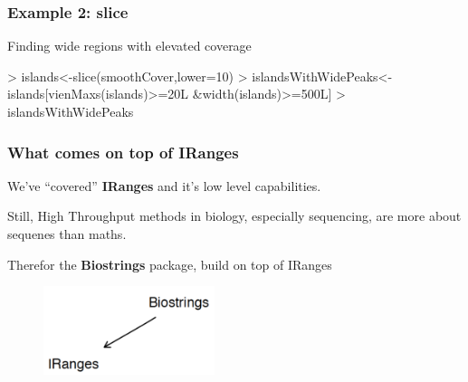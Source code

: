 \documentclass{beamer}
\begin{document}

\begin{frame}[fragile]
\frametitle{Example 2: slice}
  \bit
      \item Finding wide regions with elevated coverage
  \eit
  \begin{uncoverenv}
\begin{Schunk}
\begin{Sinput}
> islands<-slice(smoothCover,lower=10)
> islandsWithWidePeaks<- islands[vienMaxs(islands)>=20L &width(islands)>=500L]
> islandsWithWidePeaks
\end{Sinput}
\end{Schunk}
 \end{uncoverenv}
  
\end{frame}


\begin{frame}
\frametitle{What comes on top of IRanges}
  \bit
      \item We've ``covered'' \textbf{IRanges} and it's low level capabilities.
      \item Still, High Throughput methods in biology, especially sequencing, are more about sequenes than maths.
      \item Therefor the \textbf{Biostrings} package, build on top of IRanges
        \begin{figure}[ht]
              \centering
              \includegraphics[width=50mm]{diagramas/Seleccio_004.png}
        \end{figure}
  \eit
\end{frame}

\end{document}
